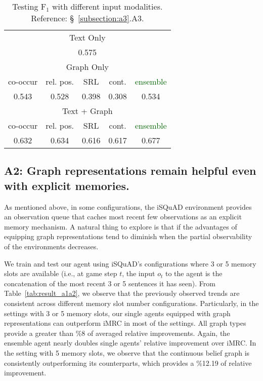 \documentclass[11pt]{article}
\newcommand{\fone}{$\text{F}_1$\xspace}
\newcommand{\isquad}{iSQuAD\xspace}
\newcommand{\imrc}{iMRC\xspace}
\begin{document}
\begin{table}[t!]
    \centering
    \small
    \begin{tabular}{ccccc}
        \toprule
        \multicolumn{5}{c}{Text Only \citep{yuan2020imrc}}\\
        \multicolumn{5}{c}{0.575}\\
        \hline
        \multicolumn{5}{c}{Graph Only}\\
        co-occur & rel. pos. & SRL & cont. & \textcolor{darkgreen}{ensemble}\\
        0.543 & 0.528 & 0.398 & 0.308 & 0.534\\
        \hline
        \multicolumn{5}{c}{Text + Graph}\\
        co-occur & rel. pos. & SRL & cont. & \textcolor{darkgreen}{ensemble}\\
        0.632 & 0.634 & 0.616 & 0.617 & 0.677 \\
        \bottomrule
    \end{tabular}
    \caption{Testing \fone  with different input modalities. \\Reference: \S~\ref{subsection:a3}.A3.}
    \label{tab:result_a3}
\end{table}



\subsection*{A2: Graph representations remain helpful even with explicit memories.}
\label{subsection:a2}

As mentioned above, in some configurations, the \isquad environment provides an observation queue that caches most recent few observations as an explicit memory mechanism.
A natural thing to explore is that if the advantages of equipping graph representations tend to diminish when the partial observability of the environments decreases. 

We train and test our agent using \isquad's configurations where 3 or 5 memory slots are available (i.e., at game step $t$, the input $o_t$ to the agent is the concatenation of the most recent 3 or 5 sentences it has seen).
From Table~\ref{tab:result_a1a2}, we observe that the previously observed trends are consistent across different memory slot number configurations.
Particularly, in the settings with 3 or 5 memory slots, our single agents equipped with graph representations can outperform \imrc in most of the settings.
All graph types provide a greater than \%8 of averaged relative improvements.
Again, the ensemble agent nearly doubles single agents' relative improvement over \imrc.
In the setting with 5 memory slots, we observe that the continuous belief graph is consistently outperforming its counterparts, which provides a \%12.19 of relative improvement.
\end{document}

